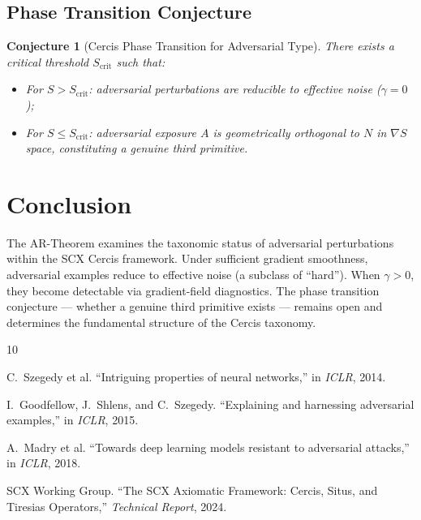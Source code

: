 \documentclass[12pt,a4paper]{article}
\newtheorem{conjecture}[theorem]{Conjecture}
\begin{document}
\subsection{Phase Transition Conjecture}

\begin{conjecture}[Cercis Phase Transition for Adversarial Type]
\label{conj:phase}
There exists a critical threshold $S_{\mathrm{crit}}$ such that:
\begin{itemize}
    \item For $S > S_{\mathrm{crit}}$: adversarial perturbations are reducible to effective noise ($\gamma = 0$);
    \item For $S \leq S_{\mathrm{crit}}$: adversarial exposure $A$ is geometrically orthogonal to $N$ in $\nabla S$ space, constituting a genuine third primitive.
\end{itemize}
\end{conjecture}

\section{Conclusion}

The AR-Theorem examines the taxonomic status of adversarial perturbations within the \textsf{SCX} Cercis framework. Under sufficient gradient smoothness, adversarial examples reduce to effective noise (a subclass of ``hard''). When $\gamma > 0$, they become detectable via gradient-field diagnostics. The phase transition conjecture --- whether a genuine third primitive exists --- remains open and determines the fundamental structure of the Cercis taxonomy.


\begin{thebibliography}{10}

C.~Szegedy et al.
\newblock ``Intriguing properties of neural networks,''
\newblock in \emph{ICLR}, 2014.

I.~Goodfellow, J.~Shlens, and C.~Szegedy.
\newblock ``Explaining and harnessing adversarial examples,''
\newblock in \emph{ICLR}, 2015.

A.~Madry et al.
\newblock ``Towards deep learning models resistant to adversarial attacks,''
\newblock in \emph{ICLR}, 2018.

SCX Working Group.
\newblock ``The \textsf{SCX} Axiomatic Framework: Cercis, Situs, and Tiresias Operators,''
\newblock \emph{Technical Report}, 2024.

\end{thebibliography}
\end{document}
